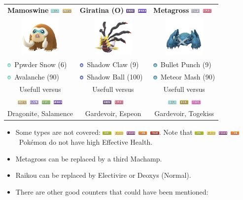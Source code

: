 \documentclass[12pt]{beamer}
\newcommand{\fightingfull}{\includegraphics[height=0.2cm]{../../images/type/full/Fighting.png}}
\newcommand{\bugfull}{\includegraphics[height=0.2cm]{../../images/type/full/Bug.png}}
\newcommand{\electricfull}{\includegraphics[height=0.2cm]{../../images/type/full/Electric.png}}
\newcommand{\fairyfull}{\includegraphics[height=0.2cm]{../../images/type/full/Fairy.png}}
\newcommand{\firefull}{\includegraphics[height=0.2cm]{../../images/type/full/Fire.png}}
\newcommand{\flyingfull}{\includegraphics[height=0.2cm]{../../images/type/full/Flying.png}}
\newcommand{\ghostfull}{\includegraphics[height=0.2cm]{../../images/type/full/Ghost.png}}
\newcommand{\dragonfull}{\includegraphics[height=0.2cm]{../../images/type/full/Dragon.png}}
\newcommand{\grassfull}{\includegraphics[height=0.2cm]{../../images/type/full/Grass.png}}
\newcommand{\groundfull}{\includegraphics[height=0.2cm]{../../images/type/full/Ground.png}}
\newcommand{\icefull}{\includegraphics[height=0.2cm]{../../images/type/full/Ice.png}}
\newcommand{\psychicfull}{\includegraphics[height=0.2cm]{../../images/type/full/Psychic.png}}
\newcommand{\rockfull}{\includegraphics[height=0.2cm]{../../images/type/full/Rock.png}}
\newcommand{\poisonfull}{\includegraphics[height=0.2cm]{../../images/type/full/Poison.png}}
\newcommand{\steelfull}{\includegraphics[height=0.2cm]{../../images/type/full/Steel.png}}
\newcommand{\ghostsimp}{\includegraphics[height=0.2cm]{../../images/type/simplified/ghost.png}}
\newcommand{\icesimp}{\includegraphics[height=0.2cm]{../../images/type/simplified/ice.png}}
\newcommand{\steelsimp}{\includegraphics[height=0.2cm]{../../images/type/simplified/steel.png}}
\begin{document}
\begin{frame}
\begin{block}{}
\begin{footnotesize}
\begin{center}
\bigskip

\begin{tabular}{p{3cm}p{3cm}p{3cm}} 
\textbf{Mamoswine} \hfill  \icefull~\groundfull&  \textbf{Giratina (O)} \hfill \ghostfull~\dragonfull & \textbf{Metagross} \hfill \steelfull~\psychicfull  \\ 
\multicolumn{1}{c}{\includegraphics[width=2cm]{../../images/pokemon/Mamoswine} }   &   \multicolumn{1}{c}{\includegraphics[width=2cm]{../../images/pokemon/Giratina_o} }   &   \multicolumn{1}{c}{\includegraphics[width=2cm]{../../images/pokemon/Metagross} } \\ \hline
\icesimp~Ppwder Snow (6) &\ghostsimp~Shadow Claw (9)&\steelsimp~Bullet Punch (9) \\
\icesimp~Avalanche (90) &\ghostsimp~Shadow Ball (100) & \steelsimp~Meteor Mash (90) \\  \hline
 \multicolumn{1}{c}{Usefull versus} &  \multicolumn{1}{c}{Usefull versus} &  \multicolumn{1}{c}{Usefull versus} \\
 \multicolumn{1}{c}{\groundfull~\flyingfull~\grassfull~\dragonfull} & \multicolumn{1}{c}{\ghostfull~\psychicfull} & \multicolumn{1}{c}{\icefull~\rockfull~\fairyfull} \\
 \multicolumn{1}{c}{Dragonite, Salamence} & \multicolumn{1}{c}{Gardevoir, Espeon} & \multicolumn{1}{c}{Gardevoir, Togekiss} \\
\end{tabular}
\end{center}

\bigskip

\begin{itemize}
\item Some types are not covered: \bugfull~\electricfull~\poisonfull~\firefull~\fightingfull. Note that \bugfull~\electricfull~\poisonfull~\firefull~Pok\'emon do not have high Effective Health.
\item Metagross can be replaced by a third Machamp.
\item Raikou can be replaced by Electivire or Deoxys (Normal).
\item There are other good counters that could have been mentioned:


\end{itemize}
\end{footnotesize}
\end{block}
\end{frame}
\end{document}
